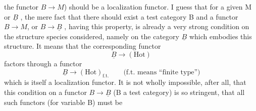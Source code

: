 the functor $B \to M$\hand{/}) should be a localization functor. I guess that for
a given M or $\underline{B}$ ,\hand{$\wedge$} the mere fact that there should exist a test category
B and a functor $B \to M$, or $B \to \underline{B}$ , having this property, is already a
very strong condition on the structure species considered, namely on
the category $\underline{B}$ which embodies this structure. It  means that
the corresponding functor
\[ \underline{B} \to (\mathrm{Hot}) \]
factors through a functor
\[ \underline{B} \to (\mathrm{Hot})_{\mathrm{f.t.}} \qquad \text{(f.t. means ``finite type'')} \]
which is itself a localization functor. It is not wholly impossible,
after all, that this condition on a functor $B \to \underline{B}$ (B a test category)
is so stringent, that all such functors (for variable B) must be
